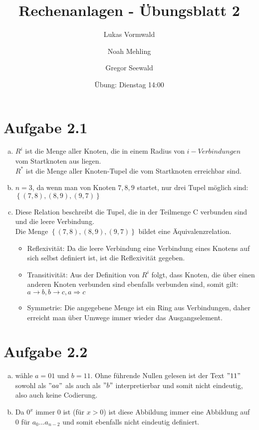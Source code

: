 \documentclass[11pt,a4paper]{article}
\title{Rechenanlagen - Übungsblatt 2}
\author{Lukas Vormwald \and Noah Mehling \and Gregor Seewald}
\date{Übung: Dienstag 14:00}
\begin{document}
	\maketitle
	\section*{Aufgabe 2.1}
		\begin{enumerate}[a)]
			\item $R^i$ ist die Menge aller Knoten, die in einem Radius von $i-Verbindungen$ vom Startknoten aus liegen.\\
			$R^*$ ist die Menge aller Knoten-Tupel die vom Startknoten erreichbar sind.
			\item $n=3$, da wenn man von Knoten $7,8,9$ startet, nur drei Tupel möglich sind:$\left\lbrace(7,8),(8,9),(9,7) \right\rbrace$
			\item Diese Relation beschreibt die Tupel, die in der Teilmenge C verbunden sind und die leere Verbindung.\\
			Die Menge $\left\lbrace(7,8),(8,9),(9,7) \right\rbrace$ bildet eine Äquivalenzrelation.\\
			\begin{itemize}
				\item Reflexivität: Da die leere Verbindung eine Verbindung eines Knotens auf sich selbst definiert ist, ist die Reflexivität gegeben.
				\item Transitivität: Aus der Definition von $R^i$ folgt, dass Knoten, die über einen anderen Knoten verbunden sind ebenfalls verbunden sind, somit gilt:$a\rightarrow b, b\rightarrow c, a \Rightarrow c$
				\item Symmetrie: Die angegebene Menge ist ein Ring aus Verbindungen, daher erreicht man über Umwege immer wieder das Ausgangselement.
			\end{itemize}
		\end{enumerate}
	\section*{Aufgabe 2.2}
		\begin{enumerate}[a)]
			\item wähle $a=01$ und $b=11$. Ohne führende Nullen gelesen ist der Text $"11"$ sowohl als $"aa"$ als auch als $"b"$ interpretierbar und somit nicht eindeutig, also auch keine Codierung.
			\item Da $0^x$ immer $0$ ist (für $x>0$) ist diese Abbildung immer eine Abbildung auf $0$ für $a_0 ... a_{n-2}$ und somit ebenfalls nicht eindeutig definiert. 
		\end{enumerate}\newpage
\end{document}

